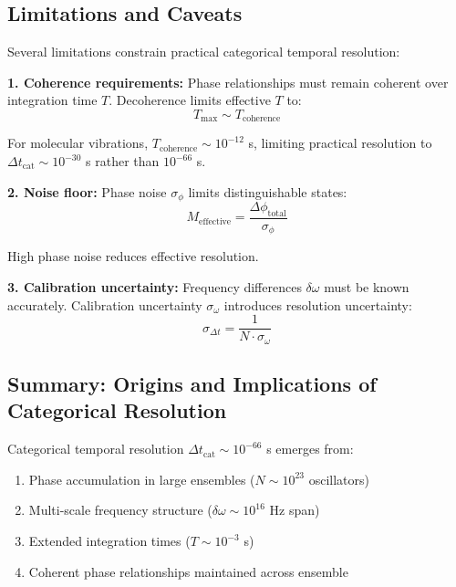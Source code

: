 \subsection{Limitations and Caveats}

Several limitations constrain practical categorical temporal resolution:

\textbf{1. Coherence requirements:} Phase relationships must remain coherent over integration time $T$. Decoherence limits effective $T$ to:
\begin{equation}
T_{\max} \sim T_{\text{coherence}}
\end{equation}

For molecular vibrations, $T_{\text{coherence}} \sim 10^{-12}$ s, limiting practical resolution to $\Delta t_{\text{cat}} \sim 10^{-30}$ s rather than $10^{-66}$ s.

\textbf{2. Noise floor:} Phase noise $\sigma_{\phi}$ limits distinguishable states:
\begin{equation}
M_{\text{effective}} = \frac{\Delta\phi_{\text{total}}}{\sigma_{\phi}}
\end{equation}

High phase noise reduces effective resolution.

\textbf{3. Calibration uncertainty:} Frequency differences $\delta\omega$ must be known accurately. Calibration uncertainty $\sigma_{\omega}$ introduces resolution uncertainty:
\begin{equation}
\sigma_{\Delta t} = \frac{1}{N \cdot \sigma_{\omega}}
\end{equation}

\subsection{Summary: Origins and Implications of Categorical Resolution}

Categorical temporal resolution $\Delta t_{\text{cat}} \sim 10^{-66}$ s emerges from:
\begin{enumerate}
\item Phase accumulation in large ensembles ($N \sim 10^{23}$ oscillators)
\item Multi-scale frequency structure ($\delta\omega \sim 10^{16}$ Hz span)
\item Extended integration times ($T \sim 10^{-3}$ s)
\item Coherent phase relationships maintained across ensemble
\end{enumerate}

